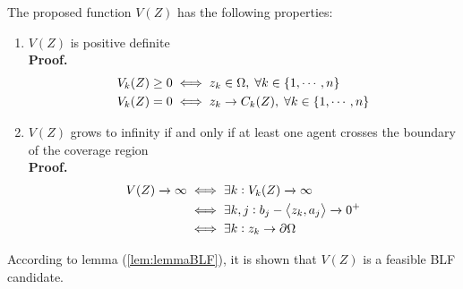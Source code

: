 \documentclass[journal]{IEEEtran}
\newcommand*{\txtspc}[1]{#1\phantom{.}}%
\begin{document}
	The proposed function $V(Z)$ has the following properties: 
	\begin{enumerate}
		\item $ V(Z) $ is positive definite \\
		\textbf{Proof.}
		\begin{equation} \notag
		\begin{split}
		V_k(Z) & \geq 0 \iff z_k \in \Omega \txtspc{,} \forall  k \in \{1,\cdots,n\} \\
		V_k(Z) & = 0  \iff z_k \rightarrow C_k(Z) \txtspc{,} \forall  k \in \{1,\cdots,n\}\\
		\end{split}
		\end{equation}
		\item $ V(Z) $ grows to infinity if and only if at least one agent crosses the boundary of the coverage region \\
		\textbf{Proof.}
		\begin{equation} \notag
		\begin{split}
		V(Z) \xrightarrow{} \infty & \iff \exists k : V_k(Z) \xrightarrow{} \infty \\
		& \iff \exists k,j :  b_j  -\left<z_k, a_j \right> \xrightarrow{}{0^+} \\
		& \iff \exists k : z_k \rightarrow \partial \Omega \\
		\end{split}
		\end{equation}
	\end{enumerate}
	
	According to lemma (\ref{lem:lemmaBLF}), it is shown that $V(Z)$ is a feasible BLF candidate.
\end{document}
